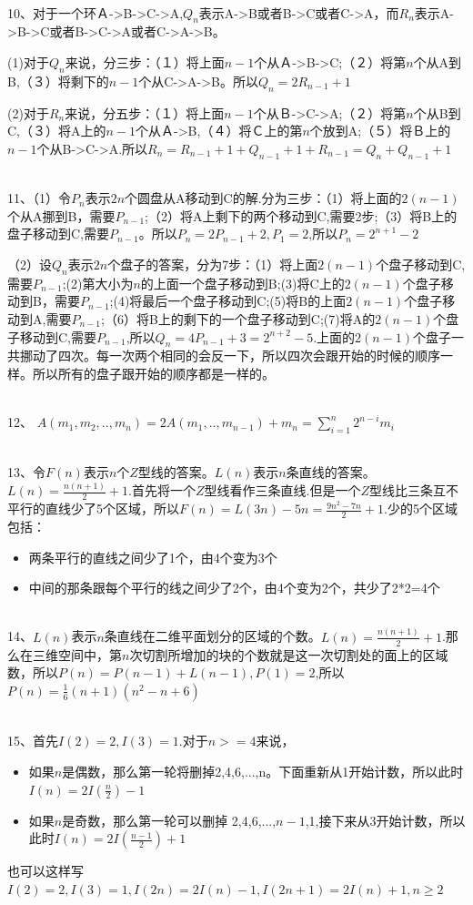 \documentclass[onecolumn]{article}
\begin{document}
\par ~\\
10、对于一个环Ａ->B->C->A,$Q_{n}$表示A->B或者B->C或者C->A，而$R_{n}$表示A->B->C或者B->C->A或者C->A->B。\par
(1)对于$Q_{n}$来说，分三步：（１）将上面$n-1$个从Ａ->B->C;（２）将第$n$个从A到B,（３）将剩下的$n-1$个从C->A->B。所以$Q_{n}=2R_{n-1}+1$ \par
(2)对于$R_{n}$来说，分五步：（１）将上面$n-1$个从Ｂ->C->A;（２）将第$n$个从B到C,（３）将A上的$n-1$个从Ａ->B,（４）将Ｃ上的第$n$个放到A;（５）将Ｂ上的$n-1$个从B->C->A.所以$R_{n}=R_{n-1}+1+Q_{n-1}+1+R_{n-1}=Q_{n}+Q_{n-1}+1$　
\par ~\\
11、（1）令$P_{n}$表示$2n$个圆盘从A移动到C的解.分为三步：（1）将上面的$2(n-1)$个从A挪到B，需要$P_{n-1}$;（2）将A上剩下的两个移动到C,需要2步;（3）将B上的盘子移动到C,需要$P_{n-1}$。所以$P_{n}=2P_{n-1}+2,P_{1}=2$,所以$P_{n}=2^{n+1}-2$ \par
（2）设$Q_{n}$表示$2n$个盘子的答案，分为7步：（1）将上面$2(n-1)$个盘子移动到C,需要$P_{n-1}$;(2)第大小为$n$的上面一个盘子移动到B;(3)将C上的$2(n-1)$个盘子移动到B，需要$P_{n-1}$;(4)将最后一个盘子移动到C;(5)将B的上面$2(n-1)$个盘子移动到A,需要$P_{n-1}$;（6）将B上的剩下的一个盘子移动到C;(7)将A的$2(n-1)$个盘子移动到C,需要$P_{n-1}$,所以$Q_{n}=4P_{n-1}+3=2^{n+2}-5$.上面的$2(n-1)$个盘子一共挪动了四次。每一次两个相同的会反一下，所以四次会跟开始的时候的顺序一样。所以所有的盘子跟开始的顺序都是一样的。
\par ~\\
12、 $A(m_{1},m_{2},..,m_{n})=2A(m_{1},..,m_{n-1})+m_{n}=\sum_{i=1}^{n}2^{n-i}m_{i}$
\par ~\\
13、令$F(n)$表示$n$个$Z$型线的答案。$L(n)$表示$n$条直线的答案。$L(n)=\frac{n(n+1)}{2}+1$.首先将一个$Z$型线看作三条直线.但是一个$Z$型线比三条互不平行的直线少了5个区域，所以$F(n)=L(3n)-5n=\frac{9n^{2}-7n}{2}+1$.少的5个区域包括：
\begin{itemize}
	\item 两条平行的直线之间少了1个，由4个变为3个
	\item 中间的那条跟每个平行的线之间少了2个，由4个变为2个，共少了2*2=4个
\end{itemize}
\par ~\\
14、$L(n)$表示$n$条直线在二维平面划分的区域的个数。$L(n)=\frac{n(n+1)}{2}+1$.那么在三维空间中，第$n$次切割所增加的块的个数就是这一次切割处的面上的区域数，所以$P(n)=P(n-1)+L(n-1),P(1)=2$,所以$P(n)=\frac{1}{6}(n+1)(n^{2}-n+6)$
\par ~\\
15、首先$I(2)=2,I(3)=1$.对于$n>=4$来说，\par
\begin{itemize}
	\item 如果$n$是偶数，那么第一轮将删掉2,4,6,...,n。下面重新从1开始计数，所以此时$I(n)=2I(\frac{n}{2})-1$
	\item 如果$n$是奇数，那么第一轮可以删掉 2,4,6,...,$n-1$,1,接下来从3开始计数，所以此时$I(n)=2I(\frac{n-1}{2})+1$
\end{itemize}
也可以这样写$I(2)=2,I(3)=1,I(2n)=2I(n)-1,I(2n+1)=2I(n)+1, n\geq 2$
\par ~\\
\end{document}
